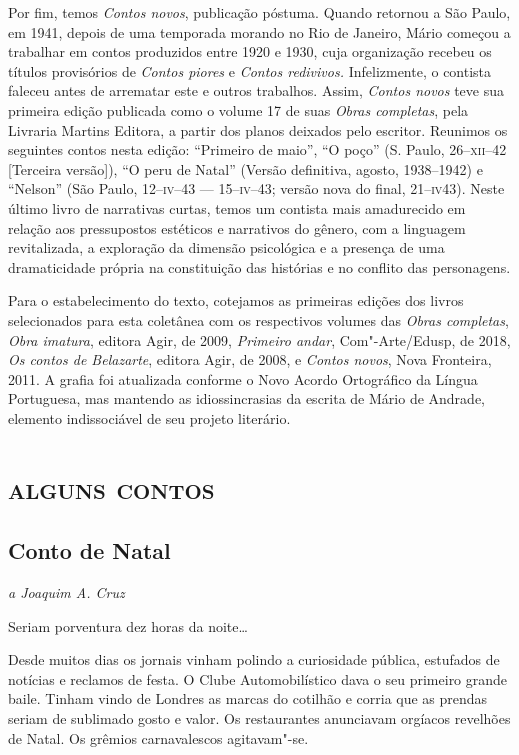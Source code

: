 Por fim, temos \emph{Contos novos}, publicação póstuma. Quando retornou
a São Paulo, em 1941, depois de uma temporada morando no Rio de Janeiro,
Mário começou a trabalhar em contos produzidos entre 1920 e 1930, cuja
organização recebeu os títulos provisórios de \emph{Contos piores} e
\emph{Contos redivivos.} Infelizmente, o contista faleceu antes de
arrematar este e outros trabalhos. Assim, \emph{Contos novos} teve sua
primeira edição publicada como o volume 17 de suas \emph{Obras
completas}, pela Livraria Martins Editora, a partir dos planos deixados
pelo escritor. Reunimos os seguintes contos nesta edição: ``Primeiro de
maio'', ``O poço'' (S. Paulo, 26--\textsc{xii}--42 {[}Terceira versão{]}), ``O peru
de Natal'' (Versão definitiva, agosto, 1938--1942) e ``Nelson'' (São
Paulo, 12--\textsc{iv}--43 --- 15--\textsc{iv}--43; versão nova do final, 21--\textsc{iv}43). %
Neste
último livro de narrativas curtas, temos um contista mais amadurecido em
relação aos pressupostos estéticos e narrativos do gênero, com a
linguagem revitalizada, a exploração da dimensão psicológica e a
presença de uma dramaticidade própria na constituição das histórias e no
conflito das personagens.

Para o estabelecimento do texto, cotejamos as primeiras edições dos
livros selecionados para esta coletânea com os respectivos volumes das
\emph{Obras completas}, \emph{Obra imatura}, editora Agir, de 2009,
\emph{Primeiro andar}, Com"-Arte/Edusp, de 2018, \emph{Os contos de
Belazarte}, editora Agir, de 2008, e \emph{Contos novos}, Nova
Fronteira, 2011. A grafia foi atualizada conforme o Novo Acordo
Ortográfico da Língua Portuguesa, mas mantendo as idiossincrasias da
escrita de Mário de Andrade, elemento indissociável de seu projeto
literário.

\part{\textsc{alguns contos}}

\chapter{Conto de Natal}

\hfill{}\emph{a Joaquim A. Cruz}\bigskip


\noindent{}Seriam porventura dez horas da noite\ldots{}

Desde muitos dias os jornais vinham polindo a curiosidade pública,
estufados de notícias e reclamos de festa. O Clube Automobilístico dava
o seu primeiro grande baile. Tinham vindo de Londres as marcas do
cotilhão e corria que as prendas seriam de sublimado gosto e valor. Os
restaurantes anunciavam orgíacos revelhões de Natal. Os grêmios
carnavalescos agitavam"-se.

